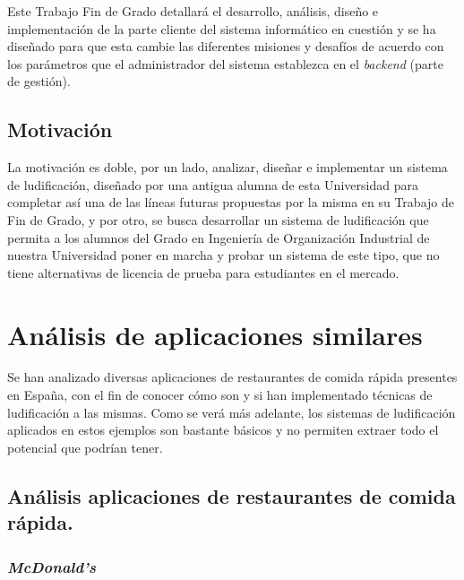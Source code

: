 \documentclass[twoside]{report}
\begin{document}
Este Trabajo Fin de Grado detallará el desarrollo, análisis, diseño e implementación de la parte cliente del sistema informático en cuestión y se ha diseñado para que esta cambie las diferentes misiones y desafíos de acuerdo con los parámetros que el administrador del sistema establezca en el \textit{backend} (parte de gestión).

\subsection{Motivación}

La motivación es doble, por un lado, analizar, diseñar e implementar un sistema de ludificación, diseñado por una antigua alumna de esta Universidad para completar así una de las líneas futuras propuestas por la misma en su Trabajo de Fin de Grado, y por otro, se busca desarrollar un sistema de ludificación que permita a los alumnos del Grado en Ingeniería de Organización Industrial de nuestra Universidad poner en marcha y probar un sistema de este tipo, que no tiene alternativas de licencia de prueba para estudiantes en el mercado.

\section{Análisis de aplicaciones similares}

Se han analizado diversas aplicaciones de restaurantes de comida rápida presentes en España, con el fin de conocer cómo son y si han implementado técnicas de ludificación a las mismas. Como se verá más adelante, los sistemas de ludificación aplicados en estos ejemplos son bastante básicos y no permiten extraer todo el potencial que podrían tener.

\subsection{Análisis aplicaciones de restaurantes de comida rápida.}
\subsubsection{\textit{McDonald's}}
\end{document}
